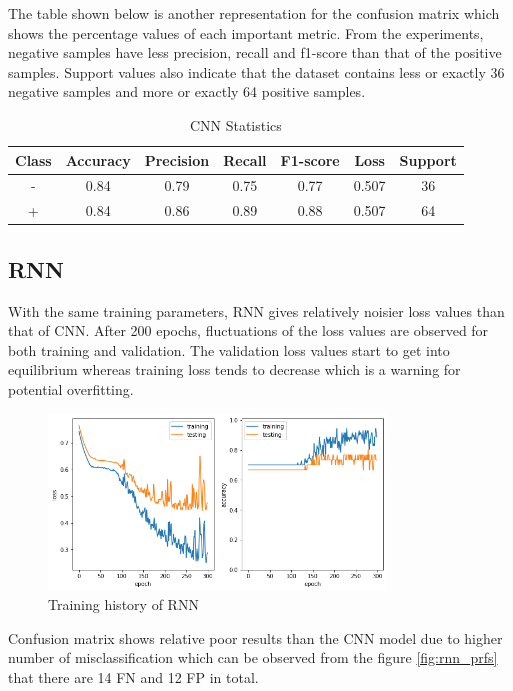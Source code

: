 \documentclass[a4paper]{article}
\begin{document}
The table shown below is another representation for the confusion matrix which shows the percentage values of each important metric. From the experiments, negative samples have less precision, 
recall and f1-score than that of the positive samples. Support values also indicate that the dataset contains less or exactly 36 negative samples and more or exactly 64 positive samples.

\begin{table}[h]
	\centering
	\begin{tabular}{|c|c|c|c|c|c|c|}
		\hline
		\textbf{Class} & \textbf{Accuracy} & \textbf{Precision} & \textbf{Recall} & \textbf{F1-score} & \textbf{Loss} & \textbf{Support} \\
		\hline
		- & 0.84 & 0.79 & 0.75 & 0.77 & 0.507 & 36 \\
		+ & 0.84 & 0.86 & 0.89 & 0.88 & 0.507 & 64 \\
		\hline
	\end{tabular}
	\caption{CNN Statistics}
	\label{tab:cnn_stats}
\end{table}

\subsection{RNN}
With the same training parameters, RNN gives relatively noisier loss values than that of CNN. After 200 epochs, fluctuations of the loss values are observed for both training and validation. The validation 
loss values start to get into equilibrium whereas training loss tends to decrease which is a warning for potential overfitting.

\begin{figure}[h]
	\centering
	\includegraphics[width=0.8\textwidth]{img/rnn_result.png}
	\caption{Training history of RNN}
	\label{fig:rnn_plot}
\end{figure}

Confusion matrix shows relative poor results than the CNN model due to higher number of misclassification which can be observed from the figure \ref{fig:rnn_prfs} that there are 14 FN and 12 FP in total.
\end{document}
